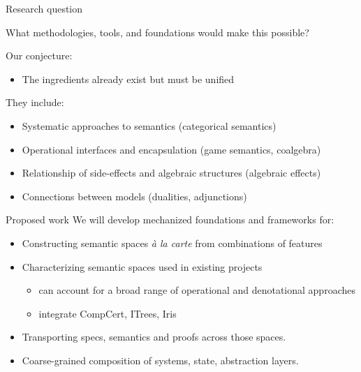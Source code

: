 \documentclass[aspectratio=1610,mathserif]{beamer}
\begin{document}
\begin{frame}{Research question}
  \begin{center}
    What methodologies, tools, and foundations would make this possible?
  \end{center}

  \vfill\pause
  Our conjecture:
  \begin{itemize}
    \item The ingredients already exist but must be unified
  \end{itemize}

  \vfill\pause
  They include:
  \begin{itemize}
    \item Systematic approaches to semantics
      (categorical semantics)
    \item Operational interfaces and encapsulation
      (game semantics, coalgebra)
    \item Relationship of side-effects and algebraic structures
      (algebraic effects)
    \item Connections between models
      (dualities, adjunctions)
  \end{itemize}
\end{frame}

\begin{frame}[fragile]{Proposed work}
  We will develop mechanized foundations and frameworks for:
  \begin{itemize}
    \item Constructing semantic spaces \emph{\`a la carte} from combinations of features
    \item Characterizing semantic spaces used in existing projects
    \begin{itemize}
      \item can account for a broad range of operational and denotational approaches
      \item integrate CompCert, ITrees, Iris
    \end{itemize}
    \item Transporting specs, semantics and proofs across those spaces.
    \item Coarse-grained composition of systems, state, abstraction layers.
  \end{itemize}
\end{frame}
\end{document}
